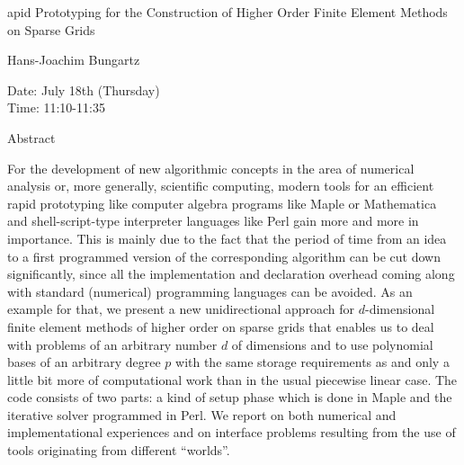 \begin{center}
\LARGE
apid Prototyping for the Construction of Higher Order
           Finite Element Methods on Sparse Grids 

\end{center}

\begin{center}
\Large
Hans-Joachim Bungartz


\end{center}

\noindent
Date:  July 18th (Thursday)\\
Time:  11:10-11:35\\

\begin{center}
\large
Abstract
\end{center}

For the development of new algorithmic concepts in the area of numerical analysis or, more
generally, scientific computing, modern tools for an efficient rapid prototyping like computer
algebra programs like Maple or Mathematica and shell-script-type interpreter languages like Perl
gain more and more in importance. This is mainly due to the fact that the period of time from an
idea to a first programmed version of the corresponding algorithm can be cut down significantly,
since all the implementation and declaration overhead coming along with standard (numerical)
programming languages can be avoided. As an example for that, we present a new unidirectional
approach for $d$-dimensional finite element methods of higher order on sparse grids that enables
us to deal with problems of an arbitrary number $d$ of dimensions and to use polynomial bases of
an arbitrary degree $p$ with the same storage requirements as and only a little bit more of
computational work than in the usual piecewise linear case. The code consists of two parts: a kind
of setup phase which is done in Maple and the iterative solver programmed in Perl. We report on
both numerical and implementational experiences and on interface problems resulting from the use
of tools originating from different ``worlds''. 

